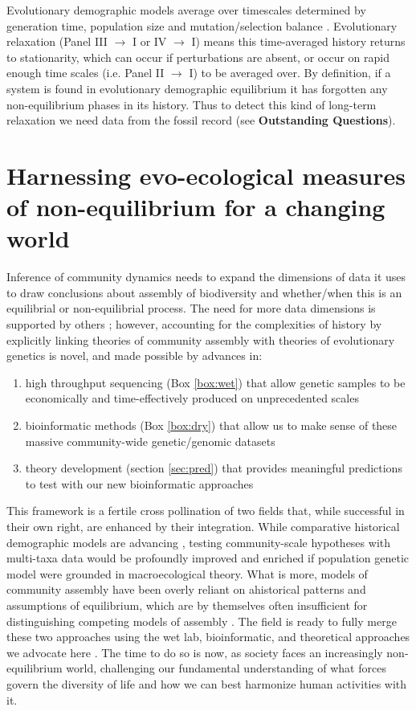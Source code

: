 \documentclass[12pt]{article}
\newcounter{Box}
\begin{document}
Evolutionary demographic models average over timescales determined by
generation time, population size and mutation/selection balance
\citep{kingman1982stochasti, rosenberg2002}. Evolutionary relaxation
(Panel III $\rightarrow$ I or IV $\rightarrow$ I) means this
time-averaged history returns to stationarity, which can occur if
perturbations are absent, or occur on rapid enough time scales
(i.e. Panel II $\rightarrow$ I) to be averaged over. By definition, if
a system is found in evolutionary demographic equilibrium it has
forgotten any non-equilibrium phases in its history.  Thus to detect
this kind of long-term relaxation we need data from the fossil record
(see {\bf Outstanding Questions}).


\section{Harnessing evo-ecological measures of non-equilibrium for a changing world}

Inference of community dynamics needs to expand the dimensions of data
it uses to draw conclusions about assembly of biodiversity and
whether/when this is an equilibrial or non-equilibrial process. The
need for more data dimensions is supported by others
\citep{mcgill2007}; however, accounting for the complexities of
history by explicitly linking theories of community assembly with
theories of evolutionary genetics is novel, and made possible by
advances in:
\begin{enumerate}
\item high throughput sequencing (Box \ref{box:wet}) that allow
  genetic samples to be economically and time-effectively produced on
  unprecedented scales
\item bioinformatic methods (Box \ref{box:dry}) that allow
  us to make sense of these massive community-wide genetic/genomic
  datasets
\item theory development (section \ref{sec:pred}) that provides
  meaningful predictions to test with our new bioinformatic approaches
\end{enumerate}

This framework is a fertile cross pollination of two fields that,
while successful in their own right, are enhanced by their
integration. While comparative historical demographic models are
advancing \citep{xue2015, hickerson2006, carstens2016, chan2014},
testing community-scale hypotheses with multi-taxa data would be
profoundly improved and enriched if population genetic model were
grounded in macroecological theory.  What is more, models of community
assembly have been overly reliant on ahistorical patterns and
assumptions of equilibrium, which are by themselves often insufficient
for distinguishing competing models of assembly \citep{mcgill2007}.
The field is ready to fully merge these two approaches using the wet
lab, bioinformatic, and theoretical approaches we advocate here . The
time to do so is now, as society faces an increasingly non-equilibrium
world, challenging our fundamental understanding of what forces
govern the diversity of life and how we can best harmonize human
activities with it.
\end{document}

